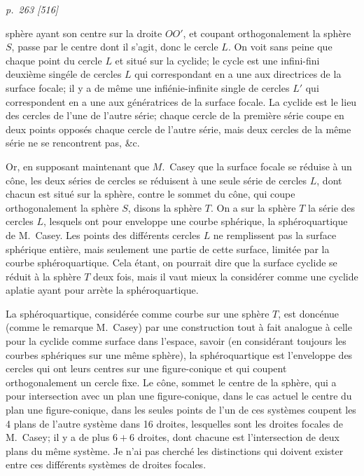 \documentclass[11pt,a4paper]{article}
\theoremstyle{plain}
\theoremstyle{definition}
\begin{document}
\clearpage

\bigskip
\textit{p.~263 [516]}
\smallskip

\noindent
sph\`ere ayant son centre sur la droite $OO'$, et coupant orthogonalement la sph\`ere $S$,
passe par le centre dont il s'agit, donc le cercle $L$.  On voit sans peine que chaque
point du cercle $L$ et situ\'e sur la cyclide; le cycle est une infini-fini deuxi\`eme
sing\'ele de cercles $L$ qui correspondant en a une aux directrices de la surface focale; il
y a de m\^eme une infi\'enie-infinite single de cercles $L'$ qui correspondent en a une aux
g\'en\'eratrices de la surface focale.  La cyclide est le lieu des cercles de l'une de l'autre
s\'erie; chaque cercle de la premi\`ere s\'erie coupe en deux points oppos\'es chaque cercle
de l'autre s\'erie, mais deux cercles de la m\^eme s\'erie ne se rencontrent pas, \&c.

Or, en supposant maintenant que $M$.~Casey que la surface focale se r\'eduise \`a un c\^one, les
deux s\'eries de cercles se r\'eduisent \`a une seule s\'erie de cercles $L$, dont chacun est
situ\'e sur la sph\`ere, contre le sommet du c\^one, qui coupe orthogonalement la sph\`ere
$S$, disons la sph\`ere $T$.  On a sur la sph\`ere $T$ la s\'erie des cercles $L$, lesquels ont pour
enveloppe une courbe sph\'erique, la sph\'eroquartique de M.~Casey.  Les points des
diff\'erents cercles $L$ ne remplissent pas la surface sph\'erique enti\`ere, mais seulement une
partie de cette surface, limit\'ee par la courbe sph\'eroquartique.  Cela \'etant, on pourrait
dire que la surface cyclide se r\'eduit \`a la sph\`ere $T$ deux fois, mais il vaut mieux
la consid\'erer comme une cyclide aplatie ayant pour arr\`ete la sph\'eroquartique.

La sph\'eroquartique, consid\'er\'ee comme courbe sur une sph\`ere $T$, est donc\'enue (comme
le remarque M.~Casey) par une construction tout \`a fait analogue \`a celle pour la cyclide
comme surface dans l'espace, savoir (en consid\'erant toujours les courbes sph\'eriques sur
une m\^eme sph\`ere), la sph\'eroquartique est l'enveloppe des cercles qui ont leurs centres
sur une figure-conique et qui coupent orthogonalement un cercle fixe.  Le c\^one, sommet
le centre de la sph\`ere, qui a pour intersection avec un plan une figure-conique, dans
le cas actuel le centre du plan une figure-conique, dans
les seules points de l'un de ces syst\`emes coupent les 4 plans de l'autre syst\`eme dans
16 droites, lesquelles sont les droites focales de M.~Casey; il y a de plus $6 + 6$
droites, dont chacune est l'intersection de deux plans du m\^eme syst\`eme.  Je n'ai pas
cherch\'e les distinctions qui doivent exister entre ces diff\'erents syst\`emes de droites
focales.
\end{document}

